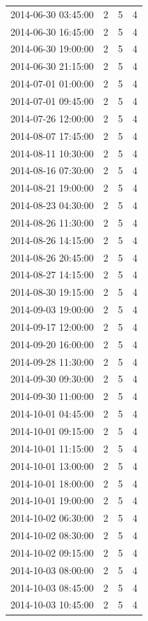 \begin{tabular}{lrrr}
2014-06-30 03:45:00 & 2 & 5 & 4 \\
2014-06-30 16:45:00 & 2 & 5 & 4 \\
2014-06-30 19:00:00 & 2 & 5 & 4 \\
2014-06-30 21:15:00 & 2 & 5 & 4 \\
2014-07-01 01:00:00 & 2 & 5 & 4 \\
2014-07-01 09:45:00 & 2 & 5 & 4 \\
2014-07-26 12:00:00 & 2 & 5 & 4 \\
2014-08-07 17:45:00 & 2 & 5 & 4 \\
2014-08-11 10:30:00 & 2 & 5 & 4 \\
2014-08-16 07:30:00 & 2 & 5 & 4 \\
2014-08-21 19:00:00 & 2 & 5 & 4 \\
2014-08-23 04:30:00 & 2 & 5 & 4 \\
2014-08-26 11:30:00 & 2 & 5 & 4 \\
2014-08-26 14:15:00 & 2 & 5 & 4 \\
2014-08-26 20:45:00 & 2 & 5 & 4 \\
2014-08-27 14:15:00 & 2 & 5 & 4 \\
2014-08-30 19:15:00 & 2 & 5 & 4 \\
2014-09-03 19:00:00 & 2 & 5 & 4 \\
2014-09-17 12:00:00 & 2 & 5 & 4 \\
2014-09-20 16:00:00 & 2 & 5 & 4 \\
2014-09-28 11:30:00 & 2 & 5 & 4 \\
2014-09-30 09:30:00 & 2 & 5 & 4 \\
2014-09-30 11:00:00 & 2 & 5 & 4 \\
2014-10-01 04:45:00 & 2 & 5 & 4 \\
2014-10-01 09:15:00 & 2 & 5 & 4 \\
2014-10-01 11:15:00 & 2 & 5 & 4 \\
2014-10-01 13:00:00 & 2 & 5 & 4 \\
2014-10-01 18:00:00 & 2 & 5 & 4 \\
2014-10-01 19:00:00 & 2 & 5 & 4 \\
2014-10-02 06:30:00 & 2 & 5 & 4 \\
2014-10-02 08:30:00 & 2 & 5 & 4 \\
2014-10-02 09:15:00 & 2 & 5 & 4 \\
2014-10-03 08:00:00 & 2 & 5 & 4 \\
2014-10-03 08:45:00 & 2 & 5 & 4 \\
2014-10-03 10:45:00 & 2 & 5 & 4 \\

\end{tabular}
